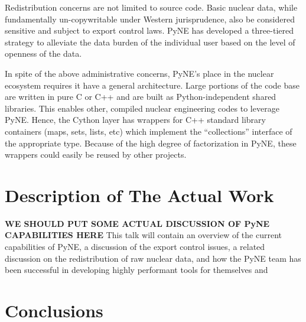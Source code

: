 \documentclass{anstrans}
\begin{document}
Redistribution concerns are not limited to source code.  Basic nuclear data, 
while fundamentally un-copywritable under Western jurisprudence, also 
be considered sensitive and subject to export control laws.  PyNE has developed
a three-tiered strategy to alleviate the data burden of the individual user based 
on the level of openness of the data. 

In spite of the above administrative concerns, PyNE's place in the nuclear ecosystem
requires it have a general architecture.  Large portions of the code base are 
written in pure C or C++ and are built as Python-independent shared libraries. This
enables other, compiled nuclear engineering codes to leverage PyNE.  Hence, the 
Cython layer has wrappers for C++ standard library containers (maps, 
sets, lists, etc) which implement the ``collections'' interface of the 
appropriate type.  Because of the high degree of factorization in PyNE, these wrappers 
could easily be reused by other projects.

\section{Description of The Actual Work}

\textbf{WE SHOULD PUT SOME ACTUAL DISCUSSION OF PyNE CAPABILITIES HERE}
This talk will contain an overview of the current capabilities of PyNE, 
a discussion of the export control issues, a related 
discussion on the redistribution of raw nuclear data, and how the PyNE
team has been successful in developing highly performant tools for themselves and

\section{Conclusions}

\nocite{*}


\end{document}
